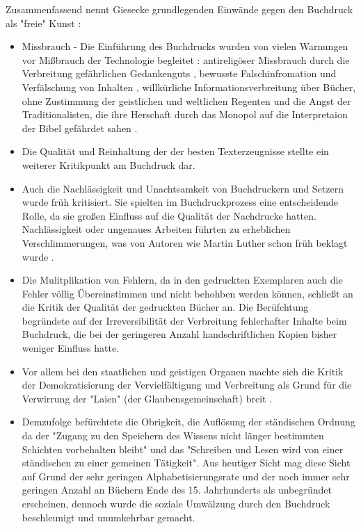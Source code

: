 Zusammenfassend nennt Giesecke grundlegenden Einwände gegen den Buchdruck als "freie" Kunst \cite{giesecke_1991_buchdruck}:
\begin{itemize}
\item Missbrauch - Die Einführung des Buchdrucks wurden von vielen Warnungen vor Mißbrauch der Technologie begleitet \cite{lange2008medienwettbewerb}: antireligöser Missbrauch durch die Verbreitung gefährlichen Gedankenguts \cite{kruse2003multimedia}, bewusste Falschinfromation und Verfälschung von Inhalten \cite{sprachgeschichte_1998_besch},  willkürliche Informationsverbreitung über Bücher, ohne Zustimmung der geistlichen und weltlichen Regenten \cite{rother_2002_siebenbuergen} und die Angst der Traditionalisten, die ihre Herschaft durch das Monopol auf die Interpretaion der Bibel gefährdet sahen \cite{lange2008medienwettbewerb}.  
\item Die Qualität und Reinhaltung der der besten Texterzeugnisse \cite{giesecke_1991_buchdruck} stellte ein weiterer Kritikpunkt am Buchdruck dar. 
\item Auch die Nachlässigkeit und Unachtsamkeit von Buchdruckern und Setzern wurde früh kritisiert. Sie spielten im Buchdruckprozess eine entscheidende Rolle, da sie großen Einfluss auf die Qualität der Nachdrucke hatten. Nachlässigkeit oder ungenaues Arbeiten führten zu erheblichen Verschlimmerungen, was von Autoren wie Martin Luther schon früh beklagt wurde \cite{sprachgeschichte_1998_besch}.
\item Die Mulitplikation von Fehlern, da in den gedruckten Exemplaren auch die Fehler völlig Übereinstimmen und nicht behohben werden können, schließt an die Kritik der Qualität der gedruckten Bücher an. Die Berüfchtung begründete auf der Irreversibilität der Verbreitung fehlerhafter Inhalte beim Buchdruck, die bei der geringeren Anzahl handschriftlichen Kopien bisher weniger Einfluss hatte.
\item Vor allem bei den staatlichen und geistigen Organen machte sich die Kritik der Demokratisierung der Vervielfältigung und Verbreitung als Grund für die Verwirrung der "Laien" (der Glaubensgemeinschaft) breit \cite{giesecke_1991_buchdruck}.
\item Demzufolge befürchtete die Obrigkeit, die Auflösung der ständischen Ordnung da der "Zugang zu den Speichern des Wissens nicht länger bestimmten Schichten vorbehalten bleibt" und das "Schreiben und Lesen wird von einer ständischen zu einer gemeinen Tätigkeit". Aus heutiger Sicht mag diese Sicht auf Grund der sehr geringen Alphabetisierungsrate und der noch immer sehr geringen Anzahl an Büchern Ende des 15. Jahrhunderts als unbegründet erscheinen, dennoch wurde die soziale Umwälzung durch den Buchdruck beschleunigt und unumkehrbar gemacht. \cite{giesecke_1991_buchdruck}

\end{itemize}
